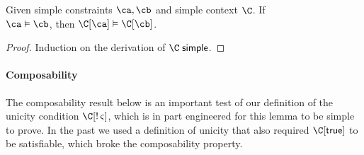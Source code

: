 \documentclass[acmsmall,screen,nonacm,review]{acmart}
\begin{document}
\begin{lemma}
  \label{lem:cong-simple}
  Given simple constraints $\ca, \cb$ and simple context $\C$.
  If \\$\ca \centails \cb$, then $\C\where{\ca} \centails \C\where{\cb}$.

  \begin{proof}
    Induction on the derivation of $\C \simple$.
  \end{proof}
\end{lemma}

\paragraph{Composability} The composability result below is an important test of our definition of the unicity condition $\Cshape \C \t \sh$, which is in part engineered for this lemma to be simple to prove. In the past we used a definition of unicity that also required $\C \where \ctrue$ to be satisfiable, which broke the composability property.
\end{document}
